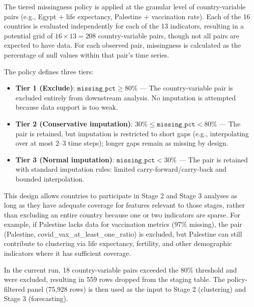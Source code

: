 \documentclass[a4paper]{report}
\begin{document}
The tiered missingness policy is applied at the granular level of country-variable pairs (e.g., Egypt + life expectancy, Palestine + vaccination rate).
Each of the 16 countries is evaluated independently for each of the 13 indicators, resulting in a potential grid of $16 \times 13 = 208$ country-variable pairs, though not all pairs are expected to have data.
For each observed pair, missingness is calculated as the percentage of null values within that pair's time series.

The policy defines three tiers:
\begin{itemize}
    \item \textbf{Tier 1 (Exclude)}: $\texttt{missing\_pct} \geq 80\%$ — The country-variable pair is excluded entirely from downstream analysis. No imputation is attempted because data support is too weak.
    \item \textbf{Tier 2 (Conservative imputation)}: $30\% \leq \texttt{missing\_pct} < 80\%$ — The pair is retained, but imputation is restricted to short gaps (e.g., interpolating over at most 2--3 time steps); longer gaps remain as missing by design.
    \item \textbf{Tier 3 (Normal imputation)}: $\texttt{missing\_pct} < 30\%$ — The pair is retained with standard imputation rules: limited carry-forward/carry-back and bounded interpolation.
\end{itemize}

This design allows countries to participate in Stage 2 and Stage 3 analyses as long as they have adequate coverage for features relevant to those stages, rather than excluding an entire country because one or two indicators are sparse.
For example, if Palestine lacks data for vaccination metrics (97\% missing), the pair (Palestine, covid\_vax\_at\_least\_one\_ratio) is excluded, but Palestine can still contribute to clustering via life expectancy, fertility, and other demographic indicators where it has sufficient coverage.

In the current run, 18 country-variable pairs exceeded the 80\% threshold and were excluded, resulting in 559 rows dropped from the staging table.
The policy-filtered panel (75,928 rows) is then used as the input to Stage 2 (clustering) and Stage 3 (forecasting).
\end{document}
